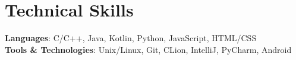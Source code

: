 \documentclass[letterpaper,11pt]{article}
\begin{document}
%
\section{Technical Skills}
 \begin{itemize}[leftmargin=0.15in, label={}]
    \small{\item{
     \textbf{Languages}{: C/C++, Java, Kotlin, Python, JavaScript, HTML/CSS} \\
     \textbf{Tools \& Technologies}{: Unix/Linux, Git, CLion, IntelliJ, PyCharm, Android} \\
    }}
 \end{itemize}


\end{document}
